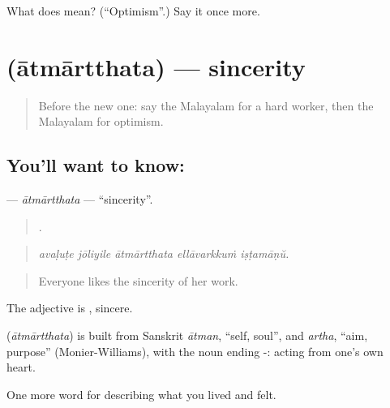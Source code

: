 \begin{tcolorbox}[breakable,colback=teal!4,colframe=teal!35!black,title={Before you move on}]
What does  mean? (\textquotedblleft{}Optimism\textquotedblright{}.) Say it once more.
\end{tcolorbox}
\section[\texorpdfstring{\ml{ആത്മാർത്ഥത} (ātmārtthata)}{ആത്മാർത്ഥത (ātmārtthata)}]{ (ātmārtthata) — sincerity}

\label{lesson:ML-C528-atmartthata}



\begin{quote}
Before the new one: say the Malayalam for a hard worker, then the Malayalam for optimism.
\end{quote}

\subsection*{You'll want to know: }
\textbf{} — \emph{ātmārtthata} — \textquotedblleft{}sincerity\textquotedblright{}.

\begin{quote}
    .
\end{quote}

\begin{quote}
\emph{avaḷuṭe jōliyile ātmārtthata ellāvarkkuṁ iṣṭamāṇŭ.}
\end{quote}

\begin{quote}
Everyone likes the sincerity of her work.
\end{quote}

The adjective is , sincere.

\begin{cousinweb}
\textbf{} (\emph{ātmārtthata}) is built from Sanskrit \emph{ātman}, \textquotedblleft{}self, soul\textquotedblright{}, and \emph{artha}, \textquotedblleft{}aim, purpose\textquotedblright{} (Monier-Williams), with the noun ending -: acting from one's own heart.
\end{cousinweb}

\begin{grammarlens}[title={What you've built}]
One more word for describing what you lived and felt.
\end{grammarlens}

